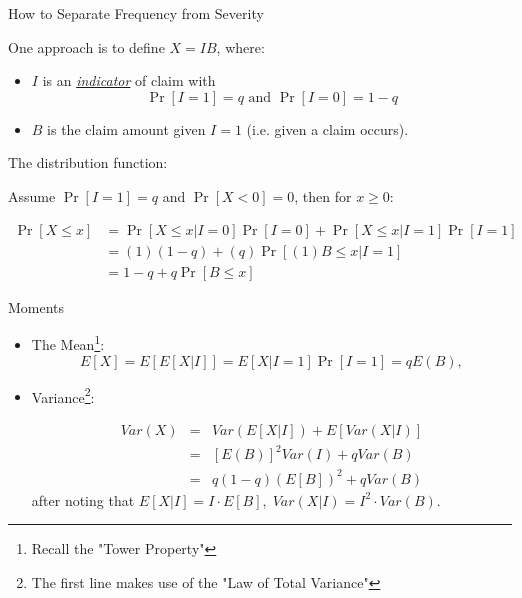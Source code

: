 \documentclass[11pt]{beamer}
\begin{document}
\begin{frame}{How to Separate Frequency from Severity}

One approach is to define $X=IB$, where:
\vfill
\begin{itemize}
\item \alert{$I$} is an \textit{\underline{indicator}} of claim with $$\Pr\left[ I=1\right] =q\text{ and }\Pr\left[ I=0\right] =1-q$$
\vfill
\item \alert{$B$} is the claim amount given $I=1$ (i.e. given a claim occurs).
\end{itemize}


\end{frame}
\begin{frame}{The distribution function:}

Assume $\Pr\left[ I=1\right] =q$ and $\Pr\left[ X< 0 \right] = 0$, then for $x\geq 0$:

\begin{align*}
 \Pr\left[ X\leq x \right] &=\Pr\left[ X\leq x | I=0\right]\Pr[I=0]+\Pr\left[ X\leq x | I=1\right]\Pr[I=1]\\
 &= (1) (1-q) + (q) \Pr\left[ (1)B\leq x | I=1\right] \\
 &=1-q+q\Pr\left[ B\leq x \right] 
\end{align*}
    
\end{frame}
\begin{frame}{Moments}

\begin{itemize}

\item The Mean\footnote{Recall the "Tower Property"}:
$$E\left[ X\right] =E\left[ E\left[ X\left\vert I\right. \right]\right] =E\left[ X\left\vert I\right. =1\right] \Pr\left[ I=1\right]=qE\left( B\right),$$

\vfill
\item Variance\footnote{The first line makes use of the "Law of Total Variance"}:

    \begin{eqnarray*}
      Var\left( X\right) &=&Var\left( E\left[ X\left\vert I\right.\right] \right)+E\left[ Var\left( X\left\vert I\right. \right) \right] \\
      &=&\left[ E\left( B\right) \right] ^{2}Var\left( I\right)+qVar\left(B\right) \\
      &=&q\left( 1-q\right) \left( E\left[ B\right] \right)^{2}+qVar\left( B\right)
    \end{eqnarray*}
    after noting that
    $
    E[ X|I] =I \cdot E[ B],\;
    Var( X| I)=I^2 \cdot Var(B).$

\end{itemize}

\end{frame}
\end{document}
